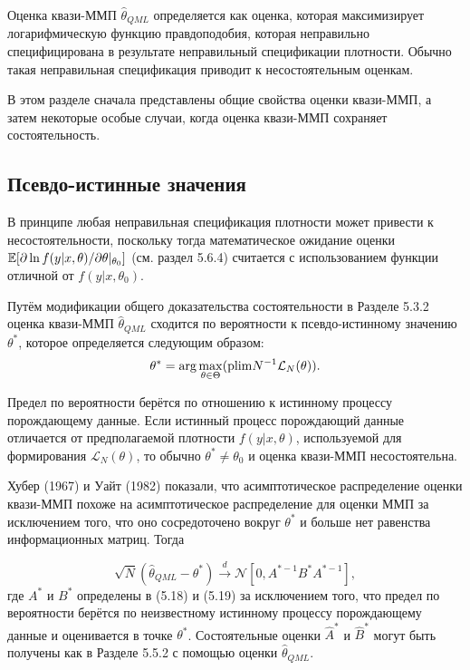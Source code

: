 Оценка квази-ММП $\hat{\theta}_{QML}$ определяется как оценка, которая максимизирует логарифмическую функцию правдоподобия, которая неправильно специфицирована в результате неправильный спецификации плотности. Обычно такая неправильная спецификация приводит к несостоятельным оценкам.

В этом разделе сначала представлены общие свойства оценки квази-ММП, а затем некоторые особые случаи, когда оценка квази-ММП сохраняет состоятельность.

\subsection{Псевдо-истинные значения}

В принципе любая неправильная спецификация плотности может привести к несостоятельности, поскольку тогда математическое ожидание оценки $\mathbb{E}[\partial \ln f(y|x,\theta)/\partial \theta|_{\theta_0}]$ (см. раздел 5.6.4) считается с использованием функции отличной от $f(y|x,\theta_0)$.

Путём модификации общего доказательства состоятельности в Разделе 5.3.2 оценка квази-ММП $\hat{\theta}_{QML}$ сходится по вероятности к псевдо-истинному значению $\theta^*$, которое определяется следующим образом:
\begin{equation}
\theta^*= \arg\max _{\theta \in \Theta} (\mathrm{plim } N^{-1} \mathcal{L}_{N}(\theta)).
\end{equation}

Предел по вероятности берётся по отношению к истинному процессу порождающему данные. Если истинный процесс порождающий данные отличается от предполагаемой плотности $f(y|x,\theta)$, используемой для формирования  $\mathcal{L}_{N}(\theta)$, то обычно $\theta^* \not = \theta_0$ и оценка квази-ММП несостоятельна.

Хубер (1967) и Уайт (1982) показали, что асимптотическое распределение оценки квази-ММП похоже на асимптотическое распределение для оценки ММП за исключением того, что оно сосредоточено вокруг $\theta^*$ и больше нет равенства информационных матриц. Тогда

\begin{equation}
\sqrt{N}(\hat{\theta}_{QML} - \theta^*) \xrightarrow{d} \mathcal{N}[0,A^{*-1}B^{*}A^{*-1}],
\end{equation}
где $A^*$ и $B^*$ определены в (5.18) и (5.19) за исключением  того, что предел по вероятности берётся по неизвестному истинному процессу порождающему данные и оценивается  в точке $\theta^*$. Состоятельные оценки $\hat{A}^*$ и $\hat{B}^*$ могут быть получены как в Разделе 5.5.2 с помощью оценки $\hat{\theta}_{QML}$.

